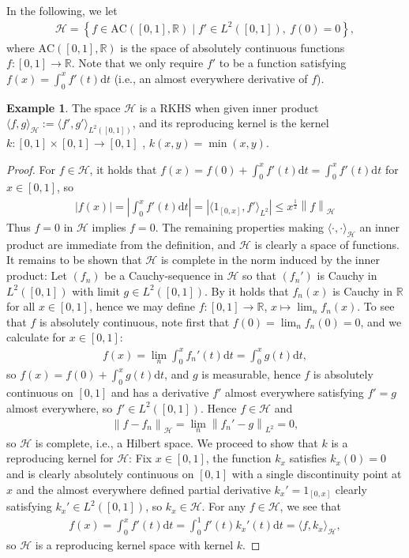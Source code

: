\documentclass[10pt,twoside,openany,final]{memoir}
\theoremstyle{definition}
\theoremstyle{Break}
\newtheorem{example}[theorem]{Example}
\newcommand{\lv}{\left\lVert}
\newcommand{\rv}{\right\rVert}
\newcommand{\R}{\mathbb{R}}
\renewcommand{\H}{\mathcal{H}}
\renewcommand{\d}{\mathrm{d}}
\begin{document}
In the following, we let 
\begin{align*}
	\H = \left\{ f \in \mathrm{AC}([0,1],\R) \mid f' \in L^2([0,1]), \ f(0) = 0  \right\},
\end{align*}
where $\mathrm{AC}([0,1],\R)$ is the space of absolutely continuous functions $f \colon [0,1] \to \R$. Note that we only require $f'$ to be a function satisfying $f(x) = \int_0^x f'(t)\d t$ (i.e., an almost everywhere derivative of $f$).
\begin{example}
	The space $\H$ is a RKHS when given inner product $\langle f,g\rangle_\H := \langle f' , g' \rangle_{L^2([0,1])}$, and its reproducing kernel is the kernel $k \colon [0,1] \times [0,1] \to [0,1]$ , $k(x,y) = \min(x,y)$.
\end{example}
\begin{proof}
	For $f \in \H$, it holds that $f(x)=f(0)+\int_0^x f'(t) \d t = \int_0^x f'(t) \d t$ for $x \in [0,1]$, so
	\begin{align}
		|f(x)| = \left| \int_0^x f'(t) \d t \right| = |\langle 1_{[0,x]},f' \rangle_{L^2}| \leq x^{\frac12} \lv f \rv_{\H} \label{Cauchy}
	\end{align}
	Thus $f = 0 $ in $\H$ implies $f = 0$. The remaining properties making $\langle \cdot , \cdot \rangle_{\H}$ an inner product are immediate from the definition, and $\H$ is clearly a space of functions. It remains to be shown that $\H$ is complete in the norm induced by the inner product: Let $(f_n)$ be a Cauchy-sequence in $\H$ so that $(f_n')$ is Cauchy in $L^2([0,1])$ with limit $g \in L^2([0,1])$. By  it holds that $f_n(x)$ is Cauchy in $\R$ for all $x \in [0,1]$, hence we may define $f \colon [0,1] \to \R$, $x \mapsto \lim_n f_n(x)$. To see that $f$ is absolutely continuous, note first that $f(0) = \lim_n f_n(0)=0$, and we calculate for $x \in [0,1]$:
	\begin{align*}
		f(x) = \lim_n \int_0^x f_n'(t) \d t = \int_0^x g(t) \d t,
	\end{align*}
	so $f(x) = f(0) + \int_0^x g(t) \d t$, and $g$ is measurable, hence $f$ is absolutely continuous on $[0,1]$ and has a derivative $f'$ almost everywhere satisfying $f' = g$ almost everywhere, so $f' \in L^2([0,1])$. Hence $f \in \H$ and
	\begin{align*}
		\lv f - f_n \rv_{\H} =  \lim_n \lv f_n' - g \rv_{L^2} = 0,
	\end{align*}
	so $\H$ is complete, i.e., a Hilbert space. We proceed to show that $k$ is a reproducing kernel for $\H$: Fix $x \in [0,1]$, the function $k_x$ satisfies $k_x(0)=0$ and is clearly absolutely continuous on $[0,1]$ with a single discontinuity point at $x$ and the almost everywhere defined partial derivative $k_x' = 1_{[0,x]}$ clearly satisfying $k_x' \in L^2([0,1])$, so $k_x \in \H$. For any $f \in \H$, we see that
	\begin{align*}
		f(x) = \int_0^x f'(t) \d t = \int_0^1 f'(t) k_x'(t) \d t = \langle f,k_x \rangle_{\H},
	\end{align*}
	so $\H$ is a reproducing kernel space with kernel $k$.
\end{proof}
\end{document}
